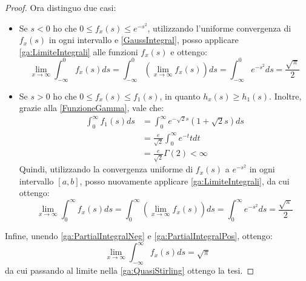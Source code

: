 \begin{proof}
	Ora distinguo due casi:
	\begin{itemize}
		\item	Se $s<0$ ho che $0\le f_x(s) \le e^{-s^2}$, utilizzando l'uniforme convergenza di $f_x(s)$ in ogni
				intervallo e \cref{GaussIntegral}, posso applicare \cref{ga:LimiteIntegrali} alle funzioni $f_x(s)$ 
				e ottengo:
				\begin{equation}\label{ga:PartialIntegralNeg}
					\lim_{x\to\infty} \int_{-\infty}^0{f_x(s)ds}=\int_{-\infty}^0{\left(\lim_{x\to\infty}f_x(s)\right)ds}
					=\int_{-\infty}^0{e^{-s^2}ds}=\frac{\sqrt{\pi}}{2}
				\end{equation}
		\item	Se $s>0$ ho che $0\le f_x(s) \le f_1(s)$, in quanto $h_x(s)\ge h_1(s)$. Inoltre, grazie
				alla \cref{FunzioneGamma}, vale che:
				\begin{equation*}
				\begin{split}
					\int_0^{\infty}{f_1(s)ds}	&=\int_0^\infty{e^{-\sqrt{2}s}\left(1+\sqrt{2}s \right)ds}\\
												&=\frac{e}{\sqrt{2}}\int_0^\infty{e^{-t}t dt}\\
												&=\frac{e}{\sqrt{2}}\Gamma(2)<\infty
				\end{split}
				\end{equation*}
				Quindi, utilizzando la convergenza uniforme di $f_x(s)$ a $e^{-s^2}$ in ogni intervallo
				$[a,b]$, posso nuovamente applicare \cref{ga:LimiteIntegrali}, da cui ottengo:
				\begin{equation}\label{ga:PartialIntegralPos}
					\lim_{x\to\infty} \int_0^\infty{f_x(s)ds}=\int_0^\infty{\left(\lim_{x\to\infty}f_x(s)\right)ds}
					=\int_0^\infty{e^{-s^2}ds}=\frac{\sqrt{\pi}}{2}
				\end{equation}
	\end{itemize}
	
	Infine, unendo \cref{ga:PartialIntegralNeg} e \cref{ga:PartialIntegralPos}, ottengo:
	\begin{equation*}
		\lim_{x\to\infty}\int_{-\infty}^\infty{ f_x(s) ds}=\sqrt{\pi}
	\end{equation*}
	da cui passando al limite nella \cref{ga:QuasiStirling} ottengo la tesi.


\end{proof}

